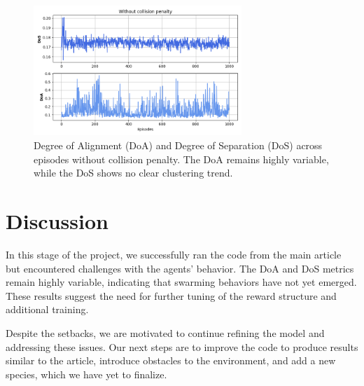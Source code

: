 \documentclass[9pt]{pnas-new}
\begin{document}
\begin{figure}[htbp]
    \centering
    \includegraphics[width=0.7\textwidth]{fig/Without_collision.png}
    \caption{Degree of Alignment (DoA) and Degree of Separation (DoS) across episodes without collision penalty. The DoA remains highly variable, while the DoS shows no clear clustering trend.}
    \label{fig:doa_dos_without_collision}
\end{figure}


\section*{Discussion}
In this stage of the project, we successfully ran the code from the main article but encountered challenges with the agents' behavior. 
The DoA and DoS metrics remain highly variable, indicating that swarming behaviors have not yet emerged. 
These results suggest the need for further tuning of the reward structure and additional training.

Despite the setbacks, we are motivated to continue refining the model and addressing these issues. 
Our next steps are to improve the code to produce results similar to the article, introduce obstacles to the environment, and add a new species, which we have yet to finalize.

\showacknow %


\begin{multicols}{2}
\end{multicols}
\end{document}
